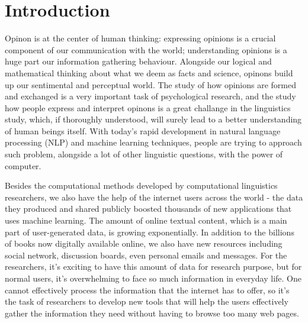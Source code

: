 \chapter{Introduction}

Opinon is at the center of human thinking: expressing opinions is a crucial component of our communication with the world; understanding opinions is a huge part our information gathering behaviour. Alongside our logical and mathematical thinking about what we deem as facts and science, opinons build up our sentimental and perceptual world. The study of how opinions are formed and exchanged is a very important task of psychological research, and the study how people express and interpret opinons is a great challange in the linguistics study, which, if thoroughly understood, will surely lead to a better understanding of human beings itself. With today's rapid development in natural language processing (NLP) and machine learning techniques, people are trying to approach such problem, alongside a lot of other linguistic questions, with the power of computer. 

Besides the computational methods developed by computational linguistics researchers, we also have the help of the internet users across the world - the data they produced and shared publicly boosted thousands of new applications that uses machine learning. The amount of online textual content, which is a main part of user-generated data, is growing exponentially. In addition to the billions of books now digitally available online, we also have new resources including social network, discussion boards, even personal emails and messages. For the researchers, it's exciting to have this amount of data for research purpose, but for normal users, it's overwhelming to face so much information in everyday life. One cannot effectively process the information that the internet has to offer, so it's the task of researchers to develop new tools that will help the users effectively gather the information they need without having to browse too many web pages. 

